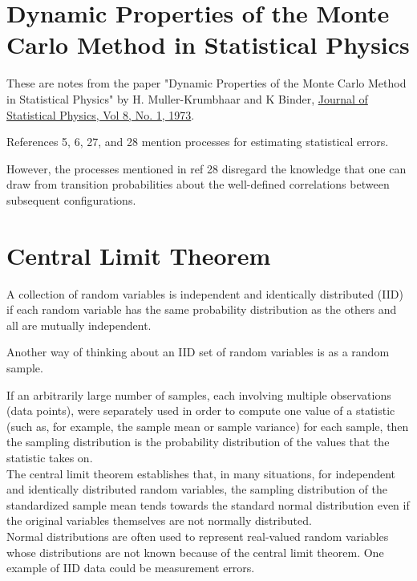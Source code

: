 \section{Dynamic Properties of the Monte Carlo Method in Statistical Physics}

These are notes from the paper
"Dynamic Properties of the Monte Carlo Method in Statistical Physics"
by H. Muller-Krumbhaar and K Binder,
\href{https://link.springer.com/article/10.1007/BF01008440}{Journal of Statistical Physics, Vol 8, No. 1, 1973}.

References 5, 6, 27, and 28 mention processes for estimating statistical errors.

However, the processes mentioned in ref 28 disregard the knowledge that one can draw from
transition probabilities about the well-defined correlations between subsequent configurations.




\section{Central Limit Theorem}

A collection of random variables is independent and identically distributed (IID)
if each random variable has the same probability distribution as the others and
all are mutually independent.

Another way of thinking about an IID set of random variables is as a random sample.

If an arbitrarily large number of samples, each involving multiple observations (data points),
were separately used in order to compute one value of a statistic
(such as, for example, the sample mean or sample variance) for each sample,
then the sampling distribution is the probability distribution of the values that the statistic takes on.
\\

The central limit theorem establishes that, in many situations,
for independent and identically distributed random variables,
the sampling distribution of the standardized sample mean tends towards the standard normal distribution
even if the original variables themselves are not normally distributed.
\\

Normal distributions are often used to represent real-valued random variables
whose distributions are not known because of the central limit theorem.
One example of IID data could be measurement errors.




